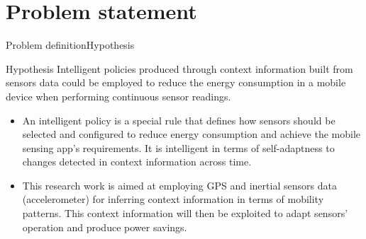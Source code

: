 \documentclass[10pt,xcolor={dvipsnames}]{beamer}
\begin{document}
\section{Problem statement}
\begin{frame}{Problem definition}{Hypothesis}
\begin{exampleblock}{Hypothesis}
Intelligent policies produced through context information built from sensors data could be employed to reduce the energy consumption in a mobile device when performing continuous sensor readings.
\end{exampleblock}
{
\small
\pause
\begin{itemize}
  \item An intelligent policy is a special rule that defines how sensors should be selected and configured to reduce energy consumption and achieve the mobile sensing app's requirements.
  It is intelligent in terms of self-adaptness to changes detected in context information across time.
  \pause
  \item This research work is aimed at employing GPS and inertial sensors data (accelerometer) for inferring context information in terms of mobility patterns.
  This context information will then be exploited to adapt sensors' operation and produce power savings.
\end{itemize}
}
\end{frame}
\end{document}
